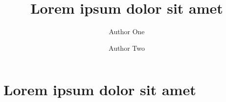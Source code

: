 \documentclass{amsart}
\begin{document}
\title{Lorem ipsum dolor sit amet}

\author[Author One]{Author One}
\author[Author Two]{Author Two}

\begin{abstract}
  \lipsum[1] %
\end{abstract}

\maketitle

\section{Lorem ipsum dolor sit amet}
\lipsum[2-4] %
\end{document}

